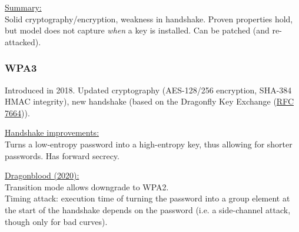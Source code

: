 \underline{Summary:}\\
Solid cryptography/encryption, weakness in handshake.
Proven properties hold, but model does not capture \textit{when} a key is installed.
Can be patched (and re-attacked).


\subsubsection*{WPA3}

Introduced in 2018.
Updated cryptography (AES-128/256 encryption, SHA-384 HMAC integrity), new handshake (based on the Dragonfly Key Exchange (\href{https://tools.ietf.org/html/rfc7664}{RFC 7664})).

\underline{Handshake improvements:}\\
Turns a low-entropy password into a high-entropy key, thus allowing for shorter passwords.
Has forward secrecy.

\href{https://wpa3.mathyvanhoef.com/}{\underline{Dragonblood} (2020):}\\
Transition mode allows downgrade to WPA2.
\\
Timing attack: execution time of turning the password into a group element at the start of the handshake depends on the password (i.e. a side-channel attack, though only for bad curves).

